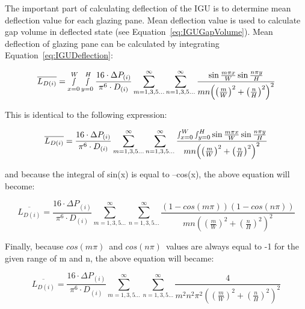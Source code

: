 The important part of calculating deflection of the IGU is to determine mean deflection value for each glazing pane. Mean deflection value is used to calculate gap volume in deflected state (see Equation~\ref{eq:IGUGapVolume}). Mean deflection of glazing pane can be calculated by integrating Equation~\ref{eq:IGUDeflection}:

\begin{equation}
\overline {{L_{D\left( i \right)}}}  = \mathop \smallint \limits_{x = 0}^W \mathop \smallint \limits_{y = 0}^H \frac{{16\cdot \Delta {P_{\left( i \right)}}}}{{{\pi ^6}\cdot {D_{\left( i \right)}}}}\mathop \sum \limits_{m = 1,3,5 \ldots }^\infty  \mathop \sum \limits_{n = 1,3,5 \ldots }^\infty  \frac{{\sin \frac{{m\pi x}}{W}\sin \frac{{n\pi y}}{H}}}{{mn{{\left( {{{\left( {\frac{m}{W}} \right)}^2} + {{\left( {\frac{n}{H}} \right)}^2}} \right)}^2}}}
\end{equation}

This is identical to the following expression:

\begin{equation}
\overline {{L_{D\left( i \right)}}}  = \frac{{16\cdot \Delta {P_{\left( i \right)}}}}{{{\pi ^6}\cdot {D_{\left( i \right)}}}}\mathop \sum \limits_{m = 1,3,5 \ldots }^\infty  \mathop \sum \limits_{n = 1,3,5 \ldots }^\infty  \frac{{\mathop \smallint \nolimits_{x = 0}^W \mathop \smallint \nolimits_{y = 0}^H \sin \frac{{m\pi x}}{W}\sin \frac{{n\pi y}}{H}}}{{mn{{\left( {{{\left( {\frac{m}{W}} \right)}^2} + {{\left( {\frac{n}{H}} \right)}^2}} \right)}^2}}}
\end{equation}

and because the integral of sin(x) is equal to --cos(x), the above equation will become:

\begin{equation}
\overline {{L_{D\left( i \right)}}}  = \frac{{16\cdot \Delta {P_{\left( i \right)}}}}{{{\pi ^6}\cdot {D_{\left( i \right)}}}}\mathop \sum \limits_{m = 1,3,5 \ldots }^\infty  \mathop \sum \limits_{n = 1,3,5 \ldots }^\infty  \frac{{\left( {1 - cos\left( {m\pi } \right)} \right)\left( {1 - cos\left( {n\pi } \right)} \right)}}{{mn{{\left( {{{\left( {\frac{m}{W}} \right)}^2} + {{\left( {\frac{n}{H}} \right)}^2}} \right)}^2}}}
\end{equation}

Finally, because \(cos\left( {m\pi } \right)\)~and \(cos\left( {n\pi } \right)\)~values are always equal to -1 for the given range of m and n, the above equation will became:

\begin{equation}
\overline {{L_{D\left( i \right)}}}  = \frac{{16\cdot \Delta {P_{\left( i \right)}}}}{{{\pi ^6}\cdot {D_{\left( i \right)}}}}\mathop \sum \limits_{m = 1,3,5 \ldots }^\infty  \mathop \sum \limits_{n = 1,3,5 \ldots }^\infty  \frac{4}{{{m^2}{n^2}{\pi ^2}{{\left( {{{\left( {\frac{m}{W}} \right)}^2} + {{\left( {\frac{n}{H}} \right)}^2}} \right)}^2}}}
\end{equation}

